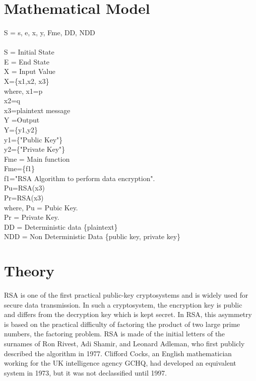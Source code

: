 \documentclass[a4paper,12pt]{article}
\begin{document}
\section{Mathematical Model}
\paragraph{} 
S 	= {s, e, x, y, Fme, DD, NDD}  											\\\\
S   =   Initial State  										\\
E 	=   End State  																\\
X	= Input Value\\
X=\{x1,x2, x3\} \\
where,  x1=p\\
x2=q\\
x3=plaintext message\\
Y	=Output\\
Y=\{y1,y2\}\\
y1=\{"Public Key"\}\\
y2=\{"Private Key"\}\\
Fme 	= 	Main function \\
Fme=\{f1\}\\f1="RSA Algorithm to perform data encryption".\\
Pu=RSA(x3)\\
Pr=RSA(x3)\\
where, Pu = Pubic Key.\\
Pr = Private Key.\\
DD 	= 	Deterministic data \{plaintext\}\\
NDD	= 	Non Deterministic Data \{public key, private key\}			\\
	
\section{Theory}
	\paragraph{} RSA is one of the first practical public-key cryptosystems and is widely used for secure data transmission. In such a cryptosystem, the encryption key is public and differs from the decryption key which is kept secret. In RSA, this asymmetry is based on the practical difficulty of factoring the product of two large prime numbers, the factoring problem. RSA is made of the initial letters of the surnames of Ron Rivest, Adi Shamir, and Leonard Adleman, who first publicly described the algorithm in 1977. Clifford Cocks, an English mathematician working for the UK intelligence agency GCHQ, had developed an equivalent system in 1973, but it was not declassified until 1997.
\end{document}
